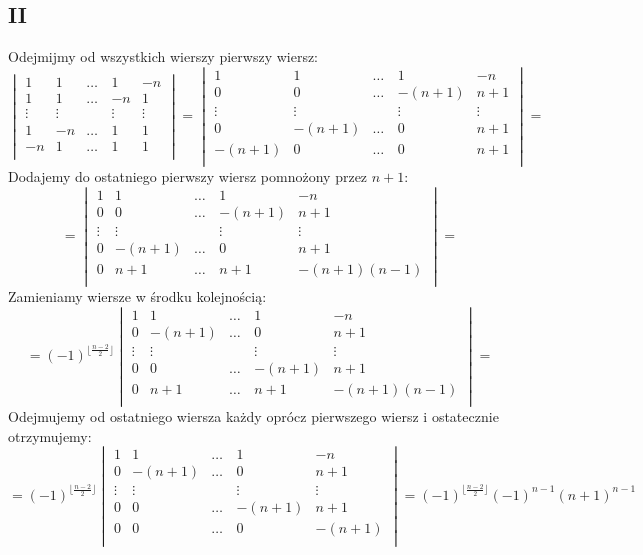 \documentclass{article}
\begin{document}
\subsection*{II}
Odejmijmy od wszystkich wierszy pierwszy wiersz:
$$
\begin{vmatrix}
1 & 1 & \dots & 1 & -n\\
1 & 1 & \dots & -n & 1\\
\vdots & \vdots & \quad & \vdots &\vdots\\
1 & -n & \dots & 1 & 1\\
-n & 1 & \dots & 1 & 1\\
\end{vmatrix} = 
\begin{vmatrix}
1 & 1 & \dots & 1 & -n\\
0 & 0 & \dots & -(n+1) & n+1\\
\vdots & \vdots & \quad & \vdots &\vdots\\
0 & -(n+1) & \dots & 0 & n + 1\\
-(n+1) & 0 & \dots & 0 & n + 1\\
\end{vmatrix} = 
$$
Dodajemy do ostatniego pierwszy wiersz pomnożony przez $n+1$:
$$
=
\begin{vmatrix}
1 & 1 & \dots & 1 & -n\\
0 & 0 & \dots & -(n+1) & n+1\\
\vdots & \vdots & \quad & \vdots &\vdots\\
0 & -(n+1) & \dots & 0 & n + 1\\
0 & n+1 & \dots & n+1 &  -(n + 1)(n-1)\\
\end{vmatrix} = 
$$
Zamieniamy wiersze w środku kolejnością:
$$
={(-1)}^{\lfloor{\frac{n-2}{2}} \rfloor}
\begin{vmatrix}
1 & 1 & \dots & 1 & -n\\
0 & -(n+1) & \dots & 0 & n + 1\\
\vdots & \vdots & \quad & \vdots &\vdots\\
0 & 0 & \dots & -(n+1) & n+1\\
0 & n+1 & \dots & n+1 &  -(n + 1)(n-1)\\
\end{vmatrix}=
$$
Odejmujemy od ostatniego wiersza każdy oprócz pierwszego wiersz i ostatecznie otrzymujemy:
$$
={(-1)}^{\lfloor{\frac{n-2}{2}} \rfloor}
\begin{vmatrix}
1 & 1 & \dots & 1 & -n\\
0 & -(n+1) & \dots & 0 & n + 1\\
\vdots & \vdots & \quad & \vdots &\vdots\\
0 & 0 & \dots & -(n+1) & n+1\\
0 & 0 & \dots & 0 &  -(n + 1)\\
\end{vmatrix}={(-1)}^{\lfloor{\frac{n-2}{2}} \rfloor}{(-1)}^{n-1}(n+1)^{n-1}
$$
\end{document}

